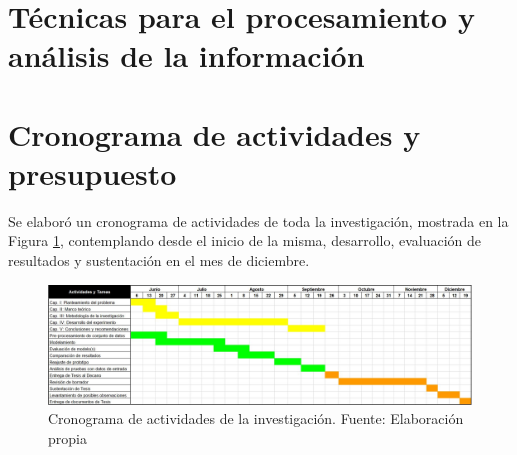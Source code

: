 \section{Técnicas para el procesamiento y análisis de la información}



\section{Cronograma de actividades y presupuesto}
Se elaboró un cronograma de actividades de toda la investigación, mostrada en la Figura \ref{3:fig2}, contemplando desde el inicio de la misma, desarrollo, evaluación de resultados y sustentación en el mes de diciembre.
\begin{figure}[h]
	\begin{center}
		\includegraphics[width=1.1\textwidth]{3/figures/cronograma.jpg}
		\caption{Cronograma de actividades de la investigación. Fuente: Elaboración propia}
		\label{3:fig2}
	\end{center}
\end{figure}